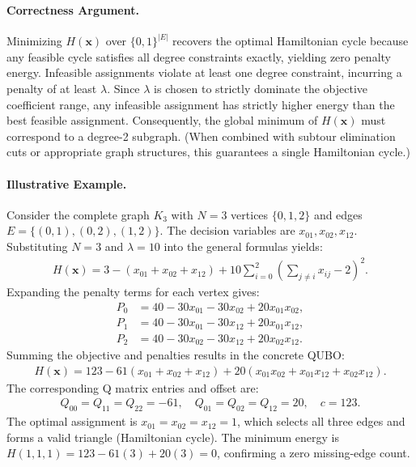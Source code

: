\documentclass[12pt]{article}
\begin{document}
\paragraph{Correctness Argument.}
Minimizing $H(\mathbf{x})$ over $\{0, 1\}^{|E|}$ recovers the optimal Hamiltonian cycle because any feasible cycle satisfies all degree constraints exactly, yielding zero penalty energy. Infeasible assignments violate at least one degree constraint, incurring a penalty of at least $\lambda$. Since $\lambda$ is chosen to strictly dominate the objective coefficient range, any infeasible assignment has strictly higher energy than the best feasible assignment. Consequently, the global minimum of $H(\mathbf{x})$ must correspond to a degree-2 subgraph. (When combined with subtour elimination cuts or appropriate graph structures, this guarantees a single Hamiltonian cycle.)

\paragraph{Illustrative Example.}
Consider the complete graph $K_3$ with $N=3$ vertices $\{0, 1, 2\}$ and edges $E = \{(0,1), (0,2), (1,2)\}$. The decision variables are $x_{01}, x_{02}, x_{12}$. Substituting $N=3$ and $\lambda=10$ into the general formulas yields:
\begin{align}
H(\mathbf{x}) = 3 - (x_{01} + x_{02} + x_{12}) + 10 \sum_{i=0}^{2} \left( \sum_{j \neq i} x_{ij} - 2 \right)^2.
\end{align}
Expanding the penalty terms for each vertex gives:
\begin{align}
P_0 &= 40 - 30x_{01} - 30x_{02} + 20x_{01}x_{02}, \\
P_1 &= 40 - 30x_{01} - 30x_{12} + 20x_{01}x_{12}, \\
P_2 &= 40 - 30x_{02} - 30x_{12} + 20x_{02}x_{12}.
\end{align}
Summing the objective and penalties results in the concrete QUBO:
\begin{align}
H(\mathbf{x}) = 123 - 61(x_{01} + x_{02} + x_{12}) + 20(x_{01}x_{02} + x_{01}x_{12} + x_{02}x_{12}).
\end{align}
The corresponding Q matrix entries and offset are:
\begin{align}
Q_{00} = Q_{11} = Q_{22} = -61, \quad Q_{01} = Q_{02} = Q_{12} = 20, \quad c = 123.
\end{align}
The optimal assignment is $x_{01} = x_{02} = x_{12} = 1$, which selects all three edges and forms a valid triangle (Hamiltonian cycle). The minimum energy is $H(1,1,1) = 123 - 61(3) + 20(3) = 0$, confirming a zero missing-edge count.
\end{document}
